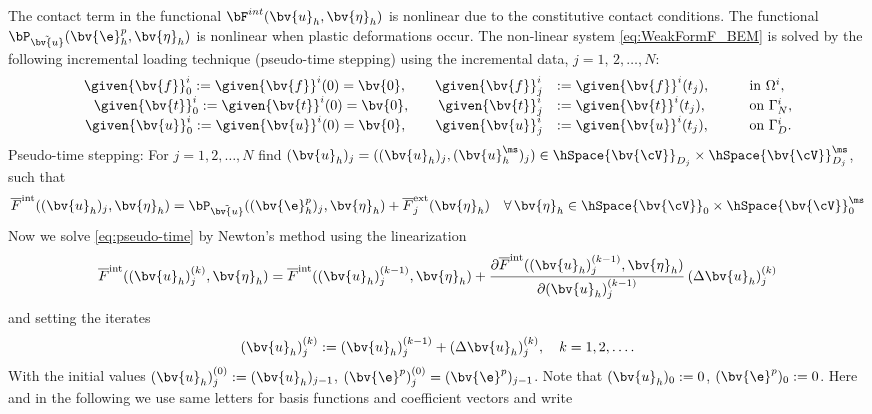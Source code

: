 The contact term in the functional $\bF^{int}(\bv{u}_h,\bv{\eta}_h)$ is nonlinear due to the constitutive contact conditions. The functional $\bP_{\tilde{\bv{u}}}(\bv{\e}_{h}^p,\bv{\eta} _h) $ is nonlinear when plastic deformations occur. The non-linear system \eqref{eq:WeakFormF_BEM} is solved by the following incremental loading technique (pseudo-time stepping) using the incremental data,
$j=1,\,2,\ldots,N$:
\begin{equation} \label{eq:loading_increments}
\begin{array}{rll}
\given{\bv{f}}^i_0:=\given{\bv{f}}^i(0)=\bv{0}, \qquad \given{\bv{f}}^i_j &:= \given{\bv{f}}^i(t_{j}), \quad&\mbox{in }\Omega^i, \\
\given{\bv{t}}^i_0:=\given{\bv{t}}^i(0)=\bv{0}, \qquad  \given{\bv{t}}^i_j &:= \given{\bv{t}}^i(t_{j}), \qquad &\mbox{on }\Gamma_N^i,\\
\given{\bv{u}}^i_0:=\given{\bv{u}}^i(0)=\bv{0}, \qquad  \given{\bv{u}}_j^i &:= \given{\bv{u}}^i(t_{j}), \qquad&\mbox{on }\Gamma_D^i.
\end{array}
\end{equation}
Pseudo-time stepping: For $j=1,2,\ldots,N$ find $(\bv{u}_h)_j=((\bv{u}_h^{\sl})_j,(\bv{u}_h^{\ms})_j) \in \hSpace{\bv{\cV}} ^{\sl}_{D_j}\times \hSpace{\bv{\cV}} ^{\ms}_{D_j}$, 
such that 
\begin{equation}\label{eq:pseudo-time}
\overline{F}^{\text{int}} ((\bv{u}_h)_j,\bv{\eta} _h) = \bP_{\tilde{\bv{u}}}((\bv{\e}_{h}^p)_j,\bv{\eta}_h)
+\overline{F}_j^{\text{ext}}(\bv{\eta} _h) \quad \forall\,\bv{\eta} _h\in\hSpace{\bv{\cV}} ^{\sl}_0\times\hSpace{\bv{\cV}} ^{\ms}_0
\end{equation}
Now we solve \eqref{eq:pseudo-time} by Newton's method using the linearization
\begin{equation}\label{eq:linearisation}
\overline{F}^{\text{int}} ((\bv{u}_h)_j^{(k)},\bv{\eta} _h) = \overline{F}^{\text{int}}
((\bv{u}_h)_j^{(k-1)},\bv{\eta} _h)+ \frac{\partial
  \overline{F}^{\text{int}}((\bv{u}_h)_j^{(k-1)},\bv{\eta} _h)}{\partial
  (\bv{u}_h)_j^{(k-1)}} \, (\Delta\bv{u}_h)_j^{(k)}
\end{equation}
and setting the iterates
\[
(\bv{u}_h)_j^{(k)}:= (\bv{u}_h)_j^{(k-1)}+ (\Delta \bv{u}_h)_j^{(k)}, \quad k=1,2,\ldots.
\]
With the initial values $(\bv{u}_h)_j^{(0)}:=(\bv{u}_h)_{j-1}$,
$(\bv{\e}^p)_j^{(0)}=(\bv{\e}^p)_{j-1}$. Note that  $(\bv{u}_h)_0:=0$,
$(\bv{\e}^p)_0:=0$. Here and in the following we use same letters for basis
functions and coefficient vectors and write

